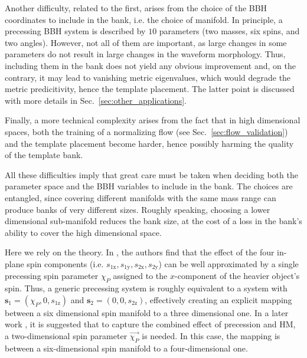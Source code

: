 \documentclass[twocolumn,showpacs,preprintnumbers,nofootinbib,prd,
superscriptaddress,10pt]{revtex4-2}
\begin{document}
Another difficulty, related to the first, arises from the choice of the BBH coordinates to include in the bank, i.e. the choice of manifold.
In principle, a precessing BBH system is described by $10$ parameters (two masses, six spins, and two angles).
However, not all of them are important, as large changes in some parameters do not result in large changes in the waveform morphology. Thus, including them in the bank does not yield any obvious improvement and, on the contrary, it may lead to vanishing metric eigenvalues, which would degrade the metric predicitivity, hence the template placement. The latter point is discussed with more details in Sec.~\ref{sec:other_applications}.

Finally, a more technical complexity arises from the fact that in high dimensional spaces, both the training of a normalizing flow (see Sec.~\ref{sec:flow_validation}) and the template placement become harder, hence possibly harming the quality of the template bank.

All these difficulties imply that great care must be taken when deciding both the parameter space and the BBH variables to include in the bank.
The choices are entangled, since covering different manifolds with the same mass range can produce banks of very different sizes.
Roughly speaking, choosing a lower dimensional sub-manifold reduces the bank size, at the cost of a loss in the bank's ability to cover the high dimensional space.

Here we rely on the theory. In \cite{Schmidt:2014iyl}, the authors find that the effect of the four in-plane spin components (i.e. $s_\text{1x}, s_\text{1y}, s_\text{2x}, s_\text{2y}$) can be well approximated by a single precessing spin parameter $\chi_P$ assigned to the $x$-component of the heavier object's spin.
Thus, a generic precessing system is roughly equivalent to a system with $\mathbf{s}_\text{1} = (\chi_P, 0, s_\text{1z})$ and $\mathbf{s}_\text{2} = (0, 0, s_\text{2z})$, effectively creating an explicit mapping between a six dimensional spin manifold to a three dimensional one.
In a later work \cite{Thomas:2020uqj}, it is suggested that to capture the combined effect of precession and HM, a two-dimensional spin parameter $\vec{\chi_P}$ is needed. In this case, the mapping is between  a six-dimensional spin manifold to a four-dimensional one.
\end{document}
